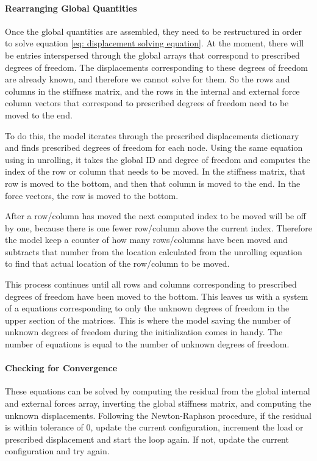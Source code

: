 \documentclass[]{spie}  %
\begin{document}
\paragraph{Rearranging Global Quantities}
Once the global quantities are assembled, they need to be restructured in order to solve equation \ref{eq: displacement solving equation}. At the moment, there will be entries interspersed through the global arrays that correspond to prescribed degrees of freedom. The displacements corresponding to these degrees of freedom are already known, and therefore we cannot solve for them. So the rows and columns in the stiffness matrix, and the rows in the internal and external force column vectors that correspond to prescribed degrees of freedom need to be moved to the end. 

To do this, the model iterates through the prescribed displacements dictionary and finds prescribed degrees of freedom for each node. Using the same equation using in unrolling, it takes the global ID and degree of freedom and computes the index of the row or column that needs to be moved. In the stiffness matrix, that row is moved to the bottom, and then that column is moved to the end. In the force vectors, the row is moved to the bottom. 

After a row/column has moved the next computed index to be moved will be off by one, because there is one fewer row/column above the current index. Therefore the model keep a counter of how many rows/columns have been moved and subtracts that number from the location calculated from the unrolling equation to find that actual location of the row/column to be moved.

This process continues until all rows and columns corresponding to prescribed degrees of freedom have been moved to the bottom. This leaves us with a system of a equations corresponding to only the unknown degrees of freedom in the upper section of the matrices. This is where the model saving the number of unknown degrees of freedom during the initialization comes in handy. The number of equations is equal to the number of unknown degrees of freedom. 

\paragraph{Checking for Convergence}
These equations can be solved by computing the residual from the global internal and external forces array, inverting the global stiffness matrix, and computing the unknown displacements. Following the Newton-Raphson procedure, if the residual is within tolerance of 0, update the current configuration, increment the load or prescribed displacement and start the loop again. If not, update the current configuration and try again. 
\end{document}
